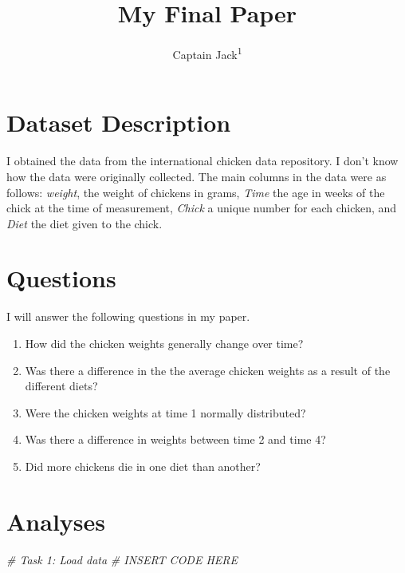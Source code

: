 \documentclass[english,man]{apa6}
\title{My Final Paper}
\author{Captain Jack\textsuperscript{1}}
\affiliation{
    \vspace{0.5cm}
          \textsuperscript{1} University of Basel  }
\newenvironment{Shaded}{\begin{snugshade}}{\end{snugshade}}
\newcommand{\CommentTok}[1]{\textcolor[rgb]{0.56,0.35,0.01}{\textit{{#1}}}}
\providecommand{\tightlist}{%
  \setlength{\itemsep}{0pt}\setlength{\parskip}{0pt}}
\begin{document}
\maketitle

\setcounter{secnumdepth}{0}



\section{Dataset Description}\label{dataset-description}

I obtained the data from the international chicken data repository. I
don't know how the data were originally collected. The main columns in
the data were as follows: \emph{weight}, the weight of chickens in
grams, \emph{Time} the age in weeks of the chick at the time of
measurement, \emph{Chick} a unique number for each chicken, and
\emph{Diet} the diet given to the chick.

\section{Questions}\label{questions}

I will answer the following questions in my paper.

\begin{enumerate}
\def\labelenumi{\arabic{enumi}.}
\tightlist
\item
  How did the chicken weights generally change over time?
\item
  Was there a difference in the the average chicken weights as a result
  of the different diets?
\item
  Were the chicken weights at time 1 normally distributed?
\item
  Was there a difference in weights between time 2 and time 4?
\item
  Did more chickens die in one diet than another?
\end{enumerate}

\section{Analyses}\label{analyses}

\begin{Shaded}
\begin{Highlighting}[]
\CommentTok{# Task 1: Load data}
\CommentTok{# INSERT CODE HERE}
\end{Highlighting}
\end{Shaded}
\end{document}

